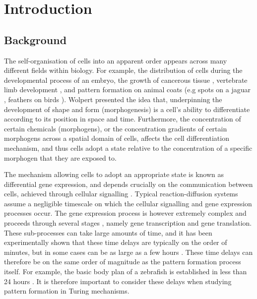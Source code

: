 \chapter{Introduction}

\section{Background}\label{section:background}

The self-organisation of cells into an apparent order appears across many different fields within biology. For example, the distribution of cells during the developmental process of an embryo, the growth of cancerous tissue \cite{morph}, vertebrate limb development \cite{miura1,glimm,miura2}, and pattern formation on animal coats (e.g spots on a jaguar \cite{painter}, feathers on birds \cite{bailleul}). Wolpert \cite{wolpert} presented the idea that, underpinning the development of shape and form (morphogenesis) is a cell's ability to differentiate according to its position in space and time. Furthermore, the concentration of certain chemicals (morphogens), or the concentration gradients of certain morphogens across a spatial domain of cells, affects the cell differentiation mechanism, and thus cells adopt a state relative to the concentration of a specific morphogen that they are exposed to.

The mechanism allowing cells to adopt an appropriate state is known as differential gene expression, and depends crucially on the communication between cells, achieved through cellular signalling \cite{gaffmonk}. Typical reaction-diffusion systems assume a negligible timescale on which the cellular signalling and gene expression processes occur. The gene expression process is however extremely complex and proceeds through several stages \cite{gaffmonk}, namely gene transcription and gene translation. These sub-processes can take large amounts of time, and it has been experimentally shown that these time delays are typically on the order of minutes, but in some cases can be as large as a few hours \cite{gaffmonk,tennyson}. These time delays can therefore be on the same order of magnitude as the pattern formation process itself. For example, the basic body plan of a zebrafish is established in less than 24 hours \cite{gaffmonk,kimmel}. It is therefore important to consider these delays when studying pattern formation in Turing mechanisms.

